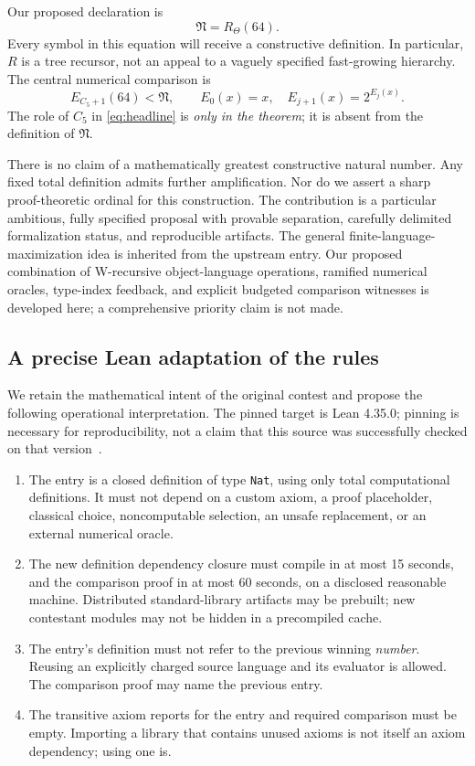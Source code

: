 \documentclass[11pt]{article}
\theoremstyle{definition}
\newcommand{\Entry}{\mathfrak N}
\newcommand{\Cfive}{C_5}
\newcommand{\code}[1]{\texttt{#1}}
\begin{document}
Our proposed declaration is
\begin{equation}\label{eq:entry}
 \boxed{\Entry=R_\Theta(64).}
\end{equation}
Every symbol in this equation will receive a constructive definition. In
particular, $R$ is a tree recursor, not an appeal to a vaguely specified
fast-growing hierarchy. The central numerical comparison is
\begin{equation}\label{eq:headline}
 \boxed{E_{\Cfive+1}(64)<\Entry,\qquad
 E_0(x)=x,\quad E_{j+1}(x)=2^{E_j(x)}.}
\end{equation}
The role of $\Cfive$ in \eqref{eq:headline} is \emph{only in the theorem}; it
is absent from the definition of $\Entry$.

There is no claim of a mathematically greatest constructive natural number.
Any fixed total definition admits further amplification. Nor do we assert a
sharp proof-theoretic ordinal for this construction. The contribution is a
particular ambitious, fully specified proposal with provable separation,
carefully delimited formalization status, and reproducible artifacts.
The general finite-language-maximization idea is inherited from the upstream
entry. Our proposed combination of W-recursive object-language operations,
ramified numerical oracles, type-index feedback, and explicit budgeted
comparison witnesses is developed here; a comprehensive priority claim is
not made.

\subsection{A precise Lean adaptation of the rules}

We retain the mathematical intent of the original contest and propose the
following operational interpretation. The pinned target is Lean 4.35.0;
pinning is necessary for reproducibility, not a claim that this source was
successfully checked on that version~\cite{leanrelease}.

\begin{enumerate}[label=\arabic*.]
\item The entry is a closed definition of type \code{Nat}, using only total
computational definitions. It must not depend on a custom axiom, a proof
placeholder, classical choice, noncomputable selection, an unsafe replacement,
or an external numerical oracle.
\item The new definition dependency closure must compile in at most 15
seconds, and the comparison proof in at most 60 seconds, on a disclosed
reasonable machine. Distributed standard-library artifacts may be prebuilt;
new contestant modules may not be hidden in a precompiled cache.
\item The entry's definition must not refer to the previous winning
\emph{number}. Reusing an explicitly charged source language and its evaluator
is allowed. The comparison proof may name the previous entry.
\item The transitive axiom reports for the entry and required comparison
must be empty. Importing a library that contains unused axioms is not itself
an axiom dependency; using one is.
\end{enumerate}
\end{document}
